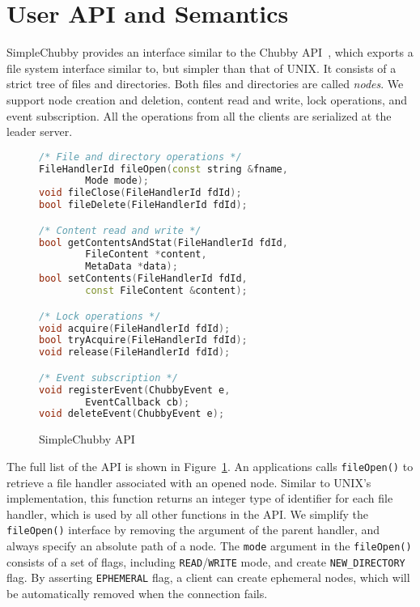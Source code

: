 \section{User API and Semantics}
\label{section:api}

SimpleChubby provides an interface similar to the Chubby API~\cite{burrows2006chubby},
which exports a file system interface similar to, but simpler than that of UNIX.
It consists of a strict tree of files and directories. Both files and directories
are called \emph{nodes}. We support node creation and deletion, content
read and write, lock operations, and event subscription.
All the operations from all the clients are serialized at the leader server.

\begin{figure}
\centering
\begin{lstlisting}[language=C++,
    basicstyle=\footnotesize\ttfamily,
    commentstyle=\bfseries,
    deletekeywords={delete},
    morekeywords={FileHandlerId, string, Mode, FileContent, MetaData, ChubbyEvent, EventCallback}]
/* File and directory operations */
FileHandlerId fileOpen(const string &fname,
        Mode mode);
void fileClose(FileHandlerId fdId);
bool fileDelete(FileHandlerId fdId);

/* Content read and write */
bool getContentsAndStat(FileHandlerId fdId,
        FileContent *content,
        MetaData *data);
bool setContents(FileHandlerId fdId,
        const FileContent &content);

/* Lock operations */
void acquire(FileHandlerId fdId);
bool tryAcquire(FileHandlerId fdId);
void release(FileHandlerId fdId);

/* Event subscription */
void registerEvent(ChubbyEvent e,
        EventCallback cb);
void deleteEvent(ChubbyEvent e);
\end{lstlisting}
\caption{SimpleChubby API}
\label{fig:api}
\end{figure}

The full list of the API is shown in Figure~\ref{fig:api}.
An applications calls \texttt{fileOpen()} to retrieve a file handler
associated with an opened node. Similar to UNIX's implementation,
this function returns an integer type of identifier for each file handler,
which is used by all other functions in the API.
We simplify the \texttt{fileOpen()} interface by removing the argument of
the parent handler, and always specify an absolute path of a node.
The \texttt{mode} argument in the \texttt{fileOpen()} consists of a set of flags,
including \texttt{READ}/\texttt{WRITE} mode, and create \texttt{NEW\_DIRECTORY} flag.
By asserting \texttt{EPHEMERAL} flag, a client can create ephemeral nodes,
which will be automatically removed when the connection fails.

